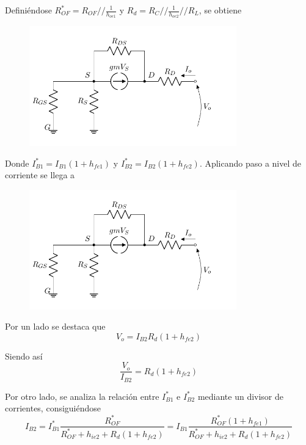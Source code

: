 Definiéndose $R_{OF}^* = R_{OF} // \frac{1}{h_{oe1}}$ y $R_d = R_C // \frac{1}{h_{oe2}} // R_L$, se obtiene
\begin{figure}[H]
\centering
	\includegraphics[width=0.8\textwidth, page=4]{Imagenes/ModeloIncremental.pdf}
\end{figure}

Donde $I_{B1}^* = I_{B1} \left( 1 + h_{fe1} \right)$ y $I_{B2}^* = I_{B2} \left( 1 + h_{fe2} \right)$. Aplicando paso a nivel de corriente se llega a
\begin{figure}[H]
\centering
	\includegraphics[width=0.8\textwidth, page=5]{Imagenes/ModeloIncremental.pdf}
\end{figure}

Por un lado se destaca que 
\begin{equation*}
	V_o = I_{B2} R_d \left( 1 + h_{fe2} \right)
\end{equation*}

Siendo así
\begin{equation}
	\frac{V_o}{I_{B2}} = R_d \left( 1 + h_{fe2} \right)
\label{equ:vo-ib2}
\end{equation}

Por otro lado, se analiza la relación entre $I_{B1}^*$ e $I_{B2}^*$ mediante un divisor de corrientes, consiguiéndose
\begin{equation*}
	I_{B2} = I_{B1}^* \frac{R_{OF}^*}{R_{OF}^* + h_{ie2} + R_d \left( 1 + h_{fe2} \right)} = I_{B1} \frac{R_{OF}^* \left( 1 + h_{fe1} \right)}{R_{OF}^* + h_{ie2} + R_d \left( 1 + h_{fe2} \right)}
\end{equation*}

